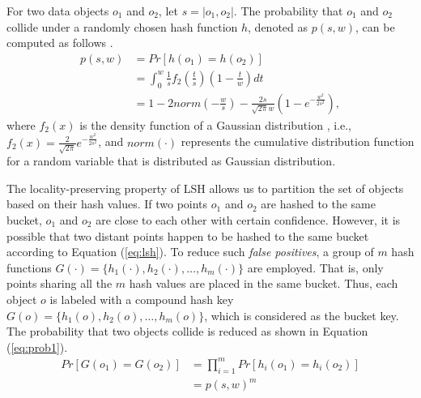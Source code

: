 For two data objects $o_1$ and $o_2$, let $s=|o_1,o_2|$. The probability that $o_1$ and $o_2$ collide under a randomly chosen hash function $h$, denoted as $p(s,w)$, can be computed as follows \cite{datar}.
\begin{equation}\label{eq:prob}
\begin{aligned}
p(s,w)&=Pr[h(o_1)=h(o_2)]\\
      &=\int_{0}^{w}\frac{1}{s}f_2(\frac{t}{s})(1-\frac{t}{w})dt\\
      &=1-2norm(-\frac{w}{s})-\frac{2s}{\sqrt{2\pi}w}(1-e^{-\frac{w^2}{2s^2}}),
\end{aligned}
\end{equation}
where $f_2(x)$ is the density function of a Gaussian distribution \cite{datar}, i.e., $f_2(x)=\frac{2}{\sqrt{2\pi}}e^{-\frac{w^2}{2s^2}}$, and $norm(\cdot)$ represents the cumulative distribution function for a random variable that is distributed as Gaussian distribution.


The locality-preserving property of LSH allows us to partition the set
of objects based on their hash values. If two points $o_1$ and $o_2$ are
hashed to the same bucket, $o_1$ and $o_2$ are close to each
other with certain confidence. However, it is possible that two distant points happen to be hashed to
the same bucket according to Equation (\ref{eq:lsh}). To reduce such
\emph{false positives}, a group of $m$ hash functions
$G(\cdot)=\{h_1(\cdot),h_2(\cdot),\ldots,h_m(\cdot)\}$ are employed. That is, only points sharing all the $m$ hash values are placed in the same bucket. Thus, each object $o$ is labeled with a compound hash key
$G(o)=\{h_1(o),h_2(o),\ldots,h_m(o)\}$, which is considered as the bucket key. The probability that two objects collide is reduced as shown in Equation (\ref{eq:prob1}).
\begin{equation}\label{eq:prob1}
%
\begin{aligned}
%
  Pr[G(o_1)=G(o_2)]&=\prod_{i=1}^m Pr[h_i(o_1)=h_i(o_2)]\\
%
&=p(s,w)^m
%
\end{aligned}
%
\end{equation}


